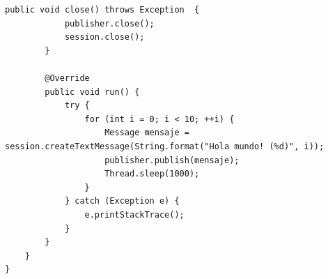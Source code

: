 \documentclass{article}
\begin{document}
\begin{lstlisting}[frame=single]
        public void close() throws Exception  {
            publisher.close();
            session.close();
        }
        
        @Override
        public void run() {
            try {
                for (int i = 0; i < 10; ++i) {
                    Message mensaje = session.createTextMessage(String.format("Hola mundo! (%d)", i));
                    publisher.publish(mensaje);
                    Thread.sleep(1000);
                }
            } catch (Exception e) {
                e.printStackTrace();
            }
        }
    }
}
\end{lstlisting}

\end{document}

